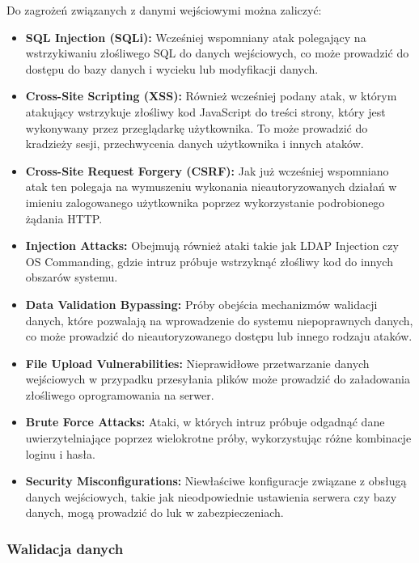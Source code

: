 \documentclass[12pt,twoside]{article}
\begin{document}
Do zagrożeń związanych z danymi wejściowymi można zaliczyć:
\begin{itemize}

    \item \textbf{SQL Injection (SQLi):} Wcześniej wspomniany atak polegający na wstrzykiwaniu złośliwego SQL do danych wejściowych, co może prowadzić do dostępu do bazy danych i wycieku lub modyfikacji danych.

    \item \textbf{Cross-Site Scripting (XSS):} Również wcześniej podany atak, w którym atakujący wstrzykuje złośliwy kod JavaScript do treści strony, który jest wykonywany przez przeglądarkę użytkownika. To może prowadzić do kradzieży sesji, przechwycenia danych użytkownika i innych ataków.

    \item \textbf{Cross-Site Request Forgery (CSRF):} Jak już wcześniej wspomniano atak ten polegaja na wymuszeniu wykonania nieautoryzowanych działań w imieniu zalogowanego użytkownika poprzez wykorzystanie podrobionego żądania HTTP.

    \item \textbf{Injection Attacks:} Obejmują również ataki takie jak LDAP Injection czy OS Commanding, gdzie intruz próbuje wstrzyknąć złośliwy kod do innych obszarów systemu.

    \item \textbf{Data Validation Bypassing:} Próby obejścia mechanizmów walidacji danych, które pozwalają na wprowadzenie do systemu niepoprawnych danych, co może prowadzić do nieautoryzowanego dostępu lub innego rodzaju ataków.

    \item \textbf{File Upload Vulnerabilities:} Nieprawidłowe przetwarzanie danych wejściowych w przypadku przesyłania plików może prowadzić do załadowania złośliwego oprogramowania na serwer.

    \item \textbf{Brute Force Attacks:} Ataki, w których intruz próbuje odgadnąć dane uwierzytelniające poprzez wielokrotne próby, wykorzystując różne kombinacje loginu i hasła.

    \item \textbf{Security Misconfigurations:} Niewłaściwe konfiguracje związane z obsługą danych wejściowych, takie jak nieodpowiednie ustawienia serwera czy bazy danych, mogą prowadzić do luk w zabezpieczeniach.

\end{itemize}
\subsubsection{Walidacja danych}
\end{document}
